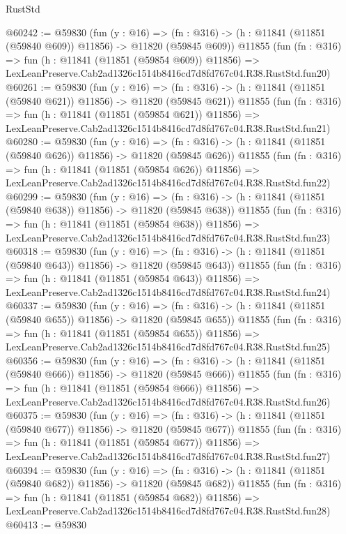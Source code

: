 \begin{lexlean}{RustStd}
\begin{coremodule}
@60242 := @59830
    (fun (y : @16) =>
    (fn : @316) -> (h : @11841 (@11851 (@59840 @609)) @11856) -> @11820 (@59845 @609))
    @11855
    (fun (fn : @316) =>
    fun (h : @11841 (@11851 (@59854 @609)) @11856) =>
    LexLeanPreserve.Cab2ad1326c1514b8416cd7d8fd767c04.R38.RustStd.fun20)
@60261 := @59830
    (fun (y : @16) =>
    (fn : @316) -> (h : @11841 (@11851 (@59840 @621)) @11856) -> @11820 (@59845 @621))
    @11855
    (fun (fn : @316) =>
    fun (h : @11841 (@11851 (@59854 @621)) @11856) =>
    LexLeanPreserve.Cab2ad1326c1514b8416cd7d8fd767c04.R38.RustStd.fun21)
@60280 := @59830
    (fun (y : @16) =>
    (fn : @316) -> (h : @11841 (@11851 (@59840 @626)) @11856) -> @11820 (@59845 @626))
    @11855
    (fun (fn : @316) =>
    fun (h : @11841 (@11851 (@59854 @626)) @11856) =>
    LexLeanPreserve.Cab2ad1326c1514b8416cd7d8fd767c04.R38.RustStd.fun22)
@60299 := @59830
    (fun (y : @16) =>
    (fn : @316) -> (h : @11841 (@11851 (@59840 @638)) @11856) -> @11820 (@59845 @638))
    @11855
    (fun (fn : @316) =>
    fun (h : @11841 (@11851 (@59854 @638)) @11856) =>
    LexLeanPreserve.Cab2ad1326c1514b8416cd7d8fd767c04.R38.RustStd.fun23)
@60318 := @59830
    (fun (y : @16) =>
    (fn : @316) -> (h : @11841 (@11851 (@59840 @643)) @11856) -> @11820 (@59845 @643))
    @11855
    (fun (fn : @316) =>
    fun (h : @11841 (@11851 (@59854 @643)) @11856) =>
    LexLeanPreserve.Cab2ad1326c1514b8416cd7d8fd767c04.R38.RustStd.fun24)
@60337 := @59830
    (fun (y : @16) =>
    (fn : @316) -> (h : @11841 (@11851 (@59840 @655)) @11856) -> @11820 (@59845 @655))
    @11855
    (fun (fn : @316) =>
    fun (h : @11841 (@11851 (@59854 @655)) @11856) =>
    LexLeanPreserve.Cab2ad1326c1514b8416cd7d8fd767c04.R38.RustStd.fun25)
@60356 := @59830
    (fun (y : @16) =>
    (fn : @316) -> (h : @11841 (@11851 (@59840 @666)) @11856) -> @11820 (@59845 @666))
    @11855
    (fun (fn : @316) =>
    fun (h : @11841 (@11851 (@59854 @666)) @11856) =>
    LexLeanPreserve.Cab2ad1326c1514b8416cd7d8fd767c04.R38.RustStd.fun26)
@60375 := @59830
    (fun (y : @16) =>
    (fn : @316) -> (h : @11841 (@11851 (@59840 @677)) @11856) -> @11820 (@59845 @677))
    @11855
    (fun (fn : @316) =>
    fun (h : @11841 (@11851 (@59854 @677)) @11856) =>
    LexLeanPreserve.Cab2ad1326c1514b8416cd7d8fd767c04.R38.RustStd.fun27)
@60394 := @59830
    (fun (y : @16) =>
    (fn : @316) -> (h : @11841 (@11851 (@59840 @682)) @11856) -> @11820 (@59845 @682))
    @11855
    (fun (fn : @316) =>
    fun (h : @11841 (@11851 (@59854 @682)) @11856) =>
    LexLeanPreserve.Cab2ad1326c1514b8416cd7d8fd767c04.R38.RustStd.fun28)
@60413 := @59830

\end{coremodule}
\end{lexlean}

